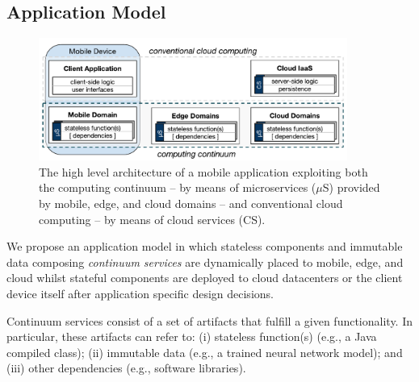 \subsection{Application Model}\label{sec:application_model}

\begin{figure}[tbp]
	\includegraphics[width=0.9\textwidth]{figs/Continuum-arch}
	\caption{The high level architecture of a mobile application exploiting both the computing continuum -- by means of microservices ($\mu$S) provided by mobile, edge, and cloud domains -- and conventional cloud computing -- by means of cloud services (CS).}
	\label{fig:Continuum-arch}
\end{figure}



We propose an application model in which stateless components and immutable data composing \textit{continuum services} are dynamically placed to mobile, edge, and cloud
whilst 
stateful components are deployed to cloud datacenters or the client device itself after application specific design decisions.

Continuum services consist of a set of artifacts that fulfill a given functionality. In particular, these artifacts can refer to: (i) stateless function(s) (e.g., a Java compiled class); (ii) immutable data (e.g., a trained neural network model); and (iii) other dependencies (e.g., software libraries).


